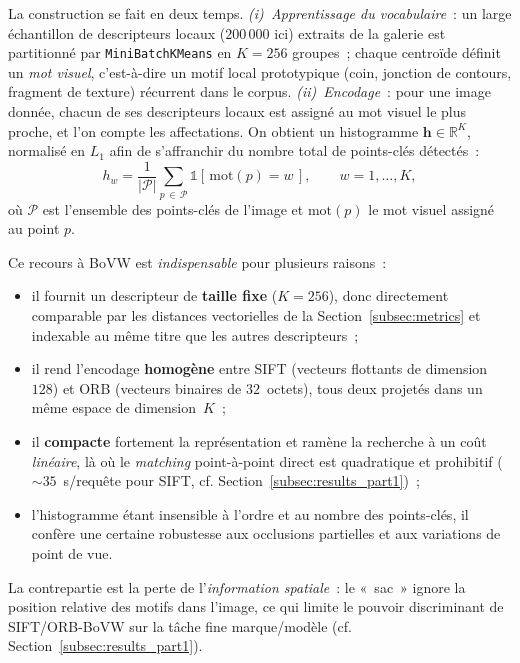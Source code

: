 \documentclass[a4paper,11pt]{article}
\begin{document}
La construction se fait en deux temps. \emph{(i)~Apprentissage du
vocabulaire}~: un large échantillon de descripteurs locaux
($200\,000$ ici) extraits de la galerie est partitionné par
\texttt{MiniBatchKMeans} en $K=256$ groupes~; chaque centroïde définit
un \emph{mot visuel}, c'est-à-dire un motif local prototypique (coin,
jonction de contours, fragment de texture) récurrent dans le corpus.
\emph{(ii)~Encodage}~: pour une image donnée, chacun de ses descripteurs
locaux est assigné au mot visuel le plus proche, et l'on compte les
affectations. On obtient un histogramme $\mathbf{h}\in\mathbb{R}^K$,
normalisé en $L_1$ afin de s'affranchir du nombre total de points-clés
détectés~:
\begin{equation}
    h_w = \frac{1}{|\mathcal{P}|}\sum_{p\,\in\,\mathcal{P}}
          \mathbb{1}\!\left[\,\text{mot}(p) = w\,\right],
    \qquad w = 1,\dots,K,
    \label{eq:bovw}
\end{equation}
où $\mathcal{P}$ est l'ensemble des points-clés de l'image et
$\text{mot}(p)$ le mot visuel assigné au point $p$.

Ce recours à BoVW est \emph{indispensable} pour plusieurs raisons~:
\begin{itemize}
    \item il fournit un descripteur de \textbf{taille fixe} ($K=256$),
    donc directement comparable par les distances vectorielles de la
    Section~\ref{subsec:metrics} et indexable au même titre que les
    autres descripteurs~;
    \item il rend l'encodage \textbf{homogène} entre SIFT (vecteurs
    flottants de dimension $128$) et ORB (vecteurs binaires de
    $32$~octets), tous deux projetés dans un même espace de
    dimension~$K$~;
    \item il \textbf{compacte} fortement la représentation et ramène la
    recherche à un coût \emph{linéaire}, là où le \textit{matching}
    point-à-point direct est quadratique et prohibitif
    ($\sim 35$~s/requête pour SIFT, cf.
    Section~\ref{subsec:results_part1})~;
    \item l'histogramme étant insensible à l'ordre et au nombre des
    points-clés, il confère une certaine robustesse aux occlusions
    partielles et aux variations de point de vue.
\end{itemize}
La contrepartie est la perte de l'\emph{information spatiale}~: le
«~sac~» ignore la position relative des motifs dans l'image, ce qui
limite le pouvoir discriminant de SIFT/ORB-BoVW sur la tâche fine
marque/modèle (cf. Section~\ref{subsec:results_part1}).
\end{document}
